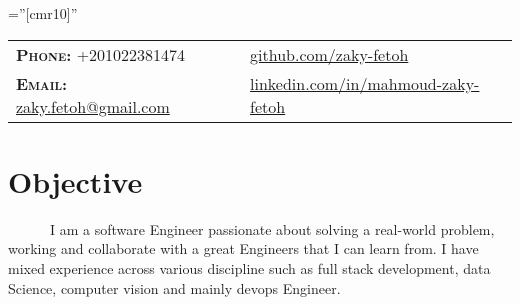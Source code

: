 \documentclass[a4paper,10pt]{article}
\begin{document}
\pagestyle{fancy}
\fancyhead{} 
\renewcommand{\headrulewidth}{0pt}

\font\fb=''[cmr10]'' 
\par{\bigskip\par} %


\begin{tabular}{lp{4cm}l}
\textbf{\textsc{Phone:}} +201022381474 && \href{https://github.com/zaky-fetoh}{github.com/zaky-fetoh} \\
\textbf{\textsc{Email:}}   \href{mailto:zaky.fetoh@gmail.com}{zaky.fetoh@gmail.com} &&\href{https://www.linkedin.com/in/mahmoud-zaky-fetoh/}{linkedin.com/in/mahmoud-zaky-fetoh}\\

\end{tabular}

\section{\textbf{Objective}}
~~~~~~I am a software Engineer passionate about solving a real-world problem, working and collaborate with a great Engineers that I can learn from. I have mixed experience across various discipline such as full stack development, data Science, computer vision and mainly devops Engineer. 
\end{document}
